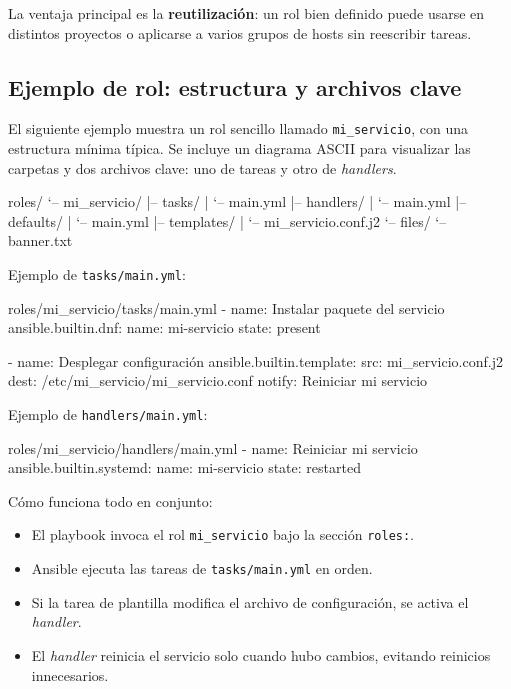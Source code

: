 La ventaja principal es la \textbf{reutilización}: un rol bien definido puede usarse en distintos proyectos o aplicarse a varios grupos de hosts sin reescribir tareas.

\subsection{Ejemplo de rol: estructura y archivos clave}
\label{subsec:ansible_roles_ejemplo}

El siguiente ejemplo muestra un rol sencillo llamado \texttt{mi\_servicio}, con una estructura mínima típica. Se incluye un diagrama ASCII para visualizar las carpetas y dos archivos clave: uno de tareas y otro de \textit{handlers}.

\begin{codeblock}
roles/
`-- mi_servicio/
    |-- tasks/
    |   `-- main.yml
    |-- handlers/
    |   `-- main.yml
    |-- defaults/
    |   `-- main.yml
    |-- templates/
    |   `-- mi_servicio.conf.j2
    `-- files/
        `-- banner.txt
\end{codeblock}

Ejemplo de \texttt{tasks/main.yml}:
\begin{yamlcode}
roles/mi_servicio/tasks/main.yml
- name: Instalar paquete del servicio
  ansible.builtin.dnf:
    name: mi-servicio
    state: present

- name: Desplegar configuración
  ansible.builtin.template:
    src: mi_servicio.conf.j2
    dest: /etc/mi_servicio/mi_servicio.conf
  notify: Reiniciar mi servicio
\end{yamlcode}

Ejemplo de \texttt{handlers/main.yml}:
\begin{yamlcode}
roles/mi_servicio/handlers/main.yml
- name: Reiniciar mi servicio
  ansible.builtin.systemd:
    name: mi-servicio
    state: restarted
\end{yamlcode}

Cómo funciona todo en conjunto:
\begin{itemize}
  \item El playbook invoca el rol \texttt{mi\_servicio} bajo la sección \texttt{roles:}.
  \item Ansible ejecuta las tareas de \texttt{tasks/main.yml} en orden.
  \item Si la tarea de plantilla modifica el archivo de configuración, se activa el \textit{handler}.
  \item El \textit{handler} reinicia el servicio solo cuando hubo cambios, evitando reinicios innecesarios.
\end{itemize}

